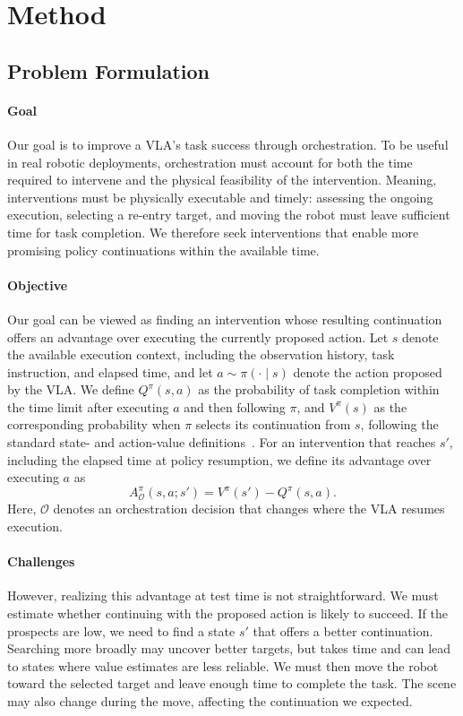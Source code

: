 \section{Method}







\subsection{Problem Formulation}

\paragraph{Goal} Our goal is to improve a VLA's task success through orchestration. To be useful in real robotic deployments, orchestration must account for both the time required to intervene and the physical feasibility of the intervention. Meaning, interventions must be physically executable and timely: assessing the ongoing execution, selecting a re-entry target, and moving the robot must leave sufficient time for task completion. We therefore seek interventions that enable more promising policy continuations within the available time.

\paragraph{Objective}
Our goal can be viewed as finding an intervention whose resulting
continuation offers an advantage over executing the currently
proposed action. Let $s$ denote the available execution context,
including the observation history, task instruction, and elapsed
time, and let $a\sim\pi(\cdot\mid s)$ denote the action proposed by
the VLA. We define $Q^\pi(s,a)$ as the probability of task completion
within the time limit after executing $a$ and then following $\pi$,
and $V^\pi(s)$ as the corresponding probability when $\pi$ selects
its continuation from $s$, following the standard state- and action-value definitions~\citep{sutton2018reinforcement}. For an intervention that reaches $s'$, including the elapsed time
at policy resumption, we define its advantage over executing $a$ as
\begin{equation}
A^\pi_{\mathcal O}(s,a;s')
=
V^\pi(s')-Q^\pi(s,a).
\label{eq:orchastration-advantage}
\end{equation}
Here, $\mathcal O$ denotes an orchestration decision that changes where the VLA resumes execution.

\paragraph{Challenges}
However, realizing this advantage at test time is not straightforward. We must estimate whether continuing with the proposed action is likely to succeed. If the prospects are low, we need to find a state $s'$ that offers a better continuation. Searching more broadly may uncover better targets, but takes time and can lead to states where value estimates are less reliable. We must then move the robot toward the selected target and leave enough time to complete the task. The scene may also change during the move, affecting the continuation we expected.

